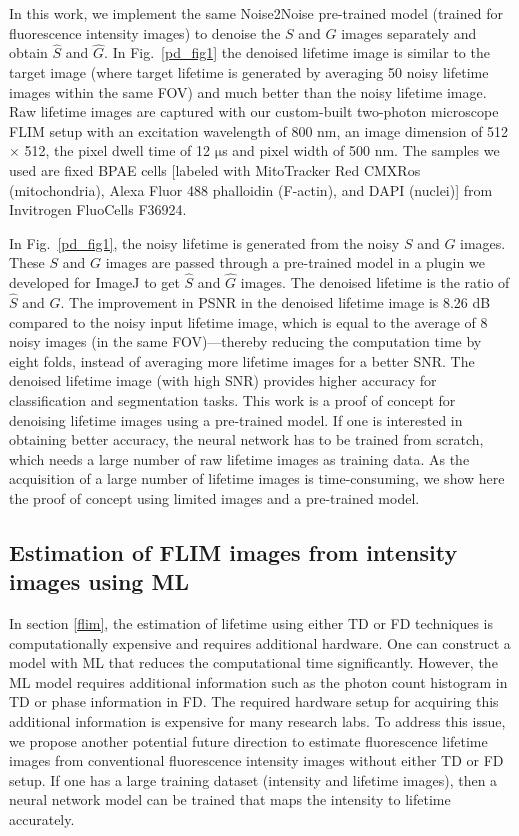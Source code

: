 \documentclass[12pt]{iopart}
\begin{document}
In this work, we implement the same Noise2Noise pre-trained model (trained for fluorescence intensity images) \cite{cvpr} to denoise the $S$ and $G$ images separately and obtain $\hat{S}$ and $\hat{G}$. In Fig.~\ref{pd_fig1} the denoised lifetime image is similar to the target image (where target lifetime is generated by averaging 50 noisy lifetime images within the same FOV) and much better than the noisy lifetime image. Raw lifetime images are captured with our custom-built two-photon microscope FLIM setup \cite{instant_flim} with an excitation wavelength of 800 nm, an image dimension of 512 $\times$ 512, the pixel dwell time of 12 $\mathrm{\mu}$s and pixel width of 500 nm. The samples we used are fixed BPAE cells [labeled with MitoTracker Red CMXRos (mitochondria), Alexa Fluor 488 phalloidin (F-actin), and DAPI (nuclei)] from Invitrogen FluoCells F36924. 

In Fig.~\ref{pd_fig1}, the noisy lifetime is generated from the noisy $S$ and $G$ images. These $S$ and $G$ images are passed through a pre-trained model in a plugin we developed for ImageJ \cite{Mannam:20} to get $\hat{S}$ and $\hat{G}$ images. The denoised lifetime is the ratio of $\hat{S}$ and $\hat{G}$. The improvement in PSNR in the denoised lifetime image is 8.26 dB compared to the noisy input lifetime image, which is equal to the average of 8 noisy images (in the same FOV)—thereby reducing the computation time by eight folds, instead of averaging more lifetime images for a better SNR. The denoised lifetime image (with high SNR) provides higher accuracy for classification and segmentation tasks. This work is a proof of concept for denoising lifetime images using a pre-trained model. If one is interested in obtaining better accuracy, the neural network has to be trained from scratch, which needs a large number of raw lifetime images as training data. As the acquisition of a large number of lifetime images is time-consuming, we show here the proof of concept using limited images and a pre-trained model.

\subsection{Estimation of FLIM images from intensity images using ML} \label{est_lifetime}
In section \ref{flim}, the estimation of lifetime using either TD or FD techniques is computationally expensive and requires additional hardware. One can construct a model with ML that reduces the computational time significantly. However, the ML model requires additional information such as the photon count histogram in TD or phase information in FD. The required hardware setup for acquiring this additional information is expensive for many research labs.
To address this issue, we propose another potential future direction to estimate fluorescence lifetime images from conventional fluorescence intensity images without either TD or FD setup. If one has a large training dataset (intensity and lifetime images), then a neural network model can be trained that maps the intensity to lifetime accurately.
\end{document}
